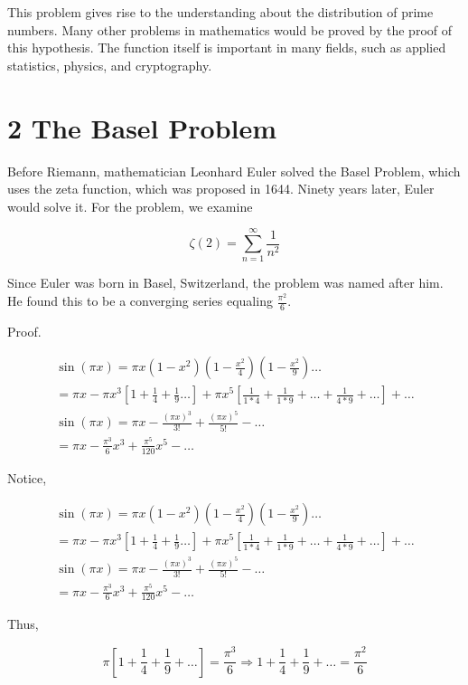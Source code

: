 \documentclass[10pt]{article}
\begin{document}
This problem gives rise to the understanding about the distribution of prime numbers. Many other problems in mathematics would be proved by the proof of this hypothesis. The function itself is important in many fields, such as applied statistics, physics, and cryptography.

\section*{2 The Basel Problem}
Before Riemann, mathematician Leonhard Euler solved the Basel Problem, which uses the zeta function, which was proposed in 1644. Ninety years later, Euler would solve it. For the problem, we examine

$$
\zeta(2)=\sum_{n=1}^{\infty} \frac{1}{n^{2}}
$$

Since Euler was born in Basel, Switzerland, the problem was named after him. He found this to be a converging series equaling $\frac{\pi^{2}}{6}$.

Proof.

$$
\begin{gathered}
\sin (\pi x)=\pi x\left(1-x^{2}\right)\left(1-\frac{x^{2}}{4}\right)\left(1-\frac{x^{2}}{9}\right) \ldots \\
=\pi x-\pi x^{3}\left[1+\frac{1}{4}+\frac{1}{9} \ldots\right]+\pi x^{5}\left[\frac{1}{1 * 4}+\frac{1}{1 * 9}+\ldots+\frac{1}{4 * 9}+\ldots\right]+\ldots \\
\sin (\pi x)=\pi x-\frac{(\pi x)^{3}}{3!}+\frac{(\pi x)^{5}}{5!}-\ldots \\
=\pi x-\frac{\pi^{3}}{6} x^{3}+\frac{\pi^{5}}{120} x^{5}-\ldots
\end{gathered}
$$

Notice,

$$
\begin{gathered}
\sin (\pi x)=\pi x\left(1-x^{2}\right)\left(1-\frac{x^{2}}{4}\right)\left(1-\frac{x^{2}}{9}\right) \ldots \\
=\pi x-\pi x^{3}\left[1+\frac{1}{4}+\frac{1}{9} \ldots\right]+\pi x^{5}\left[\frac{1}{1 * 4}+\frac{1}{1 * 9}+\ldots+\frac{1}{4 * 9}+\ldots\right]+\ldots \\
\sin (\pi x)=\pi x-\frac{(\pi x)^{3}}{3!}+\frac{(\pi x)^{5}}{5!}-\ldots \\
=\pi x-\frac{\pi^{3}}{6} x^{3}+\frac{\pi^{5}}{120} x^{5}-\ldots
\end{gathered}
$$

Thus,

$$
\pi\left[1+\frac{1}{4}+\frac{1}{9}+\ldots\right]=\frac{\pi^{3}}{6} \Longrightarrow 1+\frac{1}{4}+\frac{1}{9}+\ldots=\frac{\pi^{2}}{6}
$$
\end{document}
